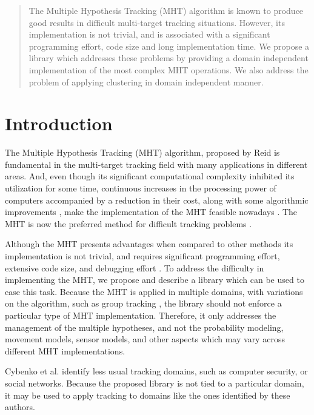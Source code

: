 ﻿

\begin{abstract}
The Multiple Hypothesis Tracking (MHT) algorithm is known to produce good results in difficult multi-target tracking situations. However, its implementation is not trivial, and is associated with a significant programming effort, code size and long implementation time. We propose a library which addresses these problems by providing a domain independent implementation of the most complex MHT operations. We also address the problem of applying clustering in domain independent manner.
\end{abstract}


\section{Introduction}
The Multiple Hypothesis Tracking (MHT) algorithm, proposed by Reid \cite{Reid79analgorithm} is fundamental in the multi-target tracking field with many applications in different areas. And, even though its significant computational complexity inhibited its utilization for some time, continuous increases in the processing power of computers accompanied by a reduction in their cost, along with some algorithmic improvements \cite{K-Best}, make the implementation of the MHT feasible nowadays \cite{EfficientMHT}. The MHT is now the preferred method for difficult tracking problems \cite{BlackmanTutorial}.

Although the MHT presents advantages when compared to other methods its implementation is not trivial, and requires significant programming effort, extensive code size, and debugging effort \cite{TheProbabilis}.
To address the difficulty in implementing the MHT, we propose and describe a library which can be used to ease this task. Because the MHT is applied in multiple domains, with variations on the algorithm, such as group tracking \cite{TrackingGroup}, the library should not enforce a particular type of MHT implementation. Therefore, it only addresses the management of the multiple hypotheses, and not the probability modeling, movement models, sensor models, and other aspects which may vary across different MHT implementations. 

Cybenko et al. \cite{WhatIsTrackable} identify less usual tracking domains, such as computer security, or social networks. Because the proposed library is not tied to a particular domain, it may be used to apply tracking to domains like the ones identified by these authors.

